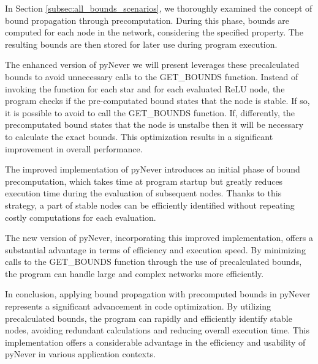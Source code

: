 In Section \ref{subsec:all_bounds_scenarios}, we thoroughly examined the concept of bound propagation through precomputation. During this phase, bounds are computed for each node in the network, considering the specified property. The resulting bounds are then stored for later use during program execution.

The enhanced version of pyNever we will present leverages these precalculated bounds to avoid unnecessary calls to the GET\_BOUNDS function. Instead of invoking the function for each star and for each evaluated ReLU node, the program checks if the pre-computated bound states that the node is stable. If so, it is possible to avoid to call the GET\_BOUNDS function. If, differently, the precomputated bound states that the node is unstalbe then it will be necessary to calculate the exact bounds.  This optimization results in a significant improvement in overall performance.

The improved implementation of pyNever introduces an initial phase of bound precomputation, which takes time at program startup but greatly reduces execution time during the evaluation of subsequent nodes. Thanks to this strategy, a part of stable nodes can be efficiently identified without repeating costly computations for each evaluation.

The new version of pyNever, incorporating this improved implementation, offers a substantial advantage in terms of efficiency and execution speed. By minimizing calls to the GET\_BOUNDS function through the use of precalculated bounds, the program can handle large and complex networks more efficiently.

In conclusion, applying bound propagation with precomputed bounds in pyNever represents a significant advancement in code optimization. By utilizing precalculated bounds, the program can rapidly and efficiently identify stable nodes, avoiding redundant calculations and reducing overall execution time. This implementation offers a considerable advantage in the efficiency and usability of pyNever in various application contexts.


